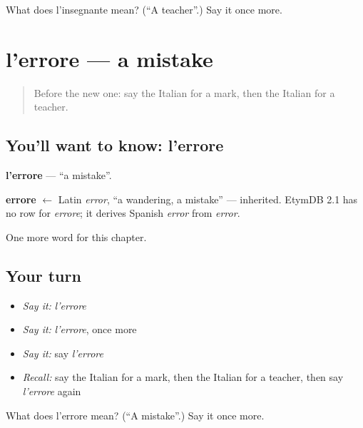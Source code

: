 \begin{tcolorbox}[breakable,colback=teal!4,colframe=teal!35!black,title={Before you move on}]
What does l'insegnante mean? (\textquotedblleft{}A teacher\textquotedblright{}.) Say it once more.
\end{tcolorbox}
\section[l'errore]{l'errore — a mistake}

\label{lesson:IT-C259-errore}



\begin{quote}
Before the new one: say the Italian for a mark, then the Italian for a teacher.
\end{quote}

\subsection*{You'll want to know: l'errore}
\textbf{l'errore} — \textquotedblleft{}a mistake\textquotedblright{}.

\begin{cousinweb}
\textbf{errore} $\leftarrow$ Latin \emph{error}, \textquotedblleft{}a wandering, a mistake\textquotedblright{} — inherited. EtymDB 2.1 has no row for \emph{errore}; it derives Spanish \emph{error} from \emph{error}.
\end{cousinweb}

\begin{grammarlens}[title={What you've built}]
One more word for this chapter.
\end{grammarlens}

\subsection*{Your turn}
\begin{itemize}
\raggedright
  \item \emph{Say it:} \emph{l'errore}
  \item \emph{Say it:} \emph{l'errore}, once more
  \item \emph{Say it:} say \emph{l'errore}
  \item \emph{Recall:} say the Italian for a mark, then the Italian for a teacher, then say \emph{l'errore} again
\end{itemize}

\begin{tcolorbox}[breakable,colback=teal!4,colframe=teal!35!black,title={Before you move on}]
What does l'errore mean? (\textquotedblleft{}A mistake\textquotedblright{}.) Say it once more.
\end{tcolorbox}
